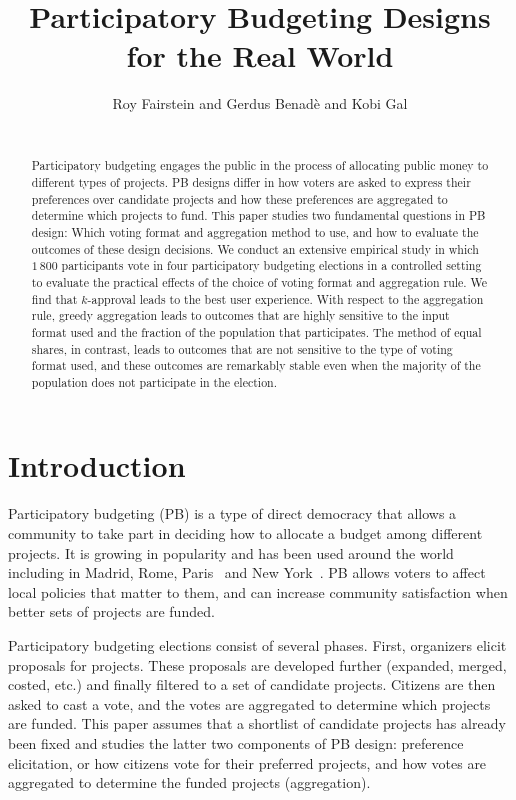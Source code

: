 \documentclass{comsoc2023}
\title{Participatory Budgeting Designs for the Real World}
\author{Roy Fairstein and Gerdus Benad\`e and Kobi Gal\\$ $ \\
}
\begin{document}

\begin{abstract}
Participatory budgeting   engages     the public in the process of allocating  public money to different types of projects. 
  PB designs  differ in how voters are asked to express their preferences over candidate projects and how these preferences are aggregated to determine which projects to fund. 
  This paper studies  two fundamental questions in PB design: Which voting format and aggregation method to use, and how to evaluate the outcomes of these design decisions.
  We conduct an extensive empirical study in which $1\,800$ participants vote in four participatory budgeting elections in a controlled setting to evaluate the practical effects of the choice of voting format and aggregation rule. 
We find that $k$-approval leads to the best user experience. 
With respect to the aggregation rule, greedy aggregation leads to outcomes that are  highly sensitive to   the input format used and the fraction of the population that participates. The method of equal shares, in contrast, leads to outcomes that are not sensitive to the type of voting format used, and these outcomes are remarkably stable even when the majority of the population does not participate in the election. 
\end{abstract}


\section{Introduction}\label{sec:intro}

Participatory budgeting (PB) is a type of direct democracy that allows a community to take part in deciding how to allocate a budget among different projects. It is growing in popularity and has been used around the world including in Madrid, Rome, Paris~\citep{sintomer2008participatory} and New York~\citep{su2017porto}.  
PB allows voters to affect local policies that matter to them, and  can increase community satisfaction when  better sets of projects are funded. 


Participatory budgeting elections consist of several phases. First, organizers elicit proposals for  projects. These proposals are developed further (expanded, merged, costed, etc.) and finally filtered to a set of candidate projects.  Citizens are then asked to cast a vote, and the votes are aggregated to determine which projects are funded. 
This paper assumes that a shortlist of candidate projects has already been fixed and studies the latter two components  of PB design: preference elicitation, or
how citizens vote  for their preferred projects,  and how votes are aggregated to determine the funded projects (aggregation). 
 
\end{document}
